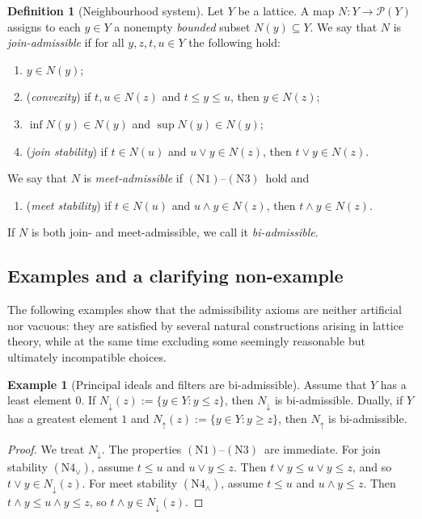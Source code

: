 \documentclass[11pt]{amsart}
\theoremstyle{definition}
\newtheorem{definition}[theorem]{Definition}
\newtheorem{example}[theorem]{Example}
\newcommand{\join}{\vee}
\newcommand{\meet}{\wedge}
\newcommand{\Pow}{\mathcal{P}}
\newcommand{\NOne}{\ensuremath{\mathrm{(N1)}}}
\newcommand{\NThree}{\ensuremath{\mathrm{(N3)}}}
\newcommand{\NFourJoin}{\ensuremath{\mathrm{(N4_{\vee})}}}
\newcommand{\NFourMeet}{\ensuremath{\mathrm{(N4_{\wedge})}}}
\begin{document}
\begin{definition}[Neighbourhood system]\label{def:neigh}
Let $Y$ be a lattice.
A map $N\colon Y\to\Pow(Y)$ assigns to each $y\in Y$ a nonempty \emph{bounded} subset $N(y)\subseteq Y$.
We say that $N$ is \emph{join-admissible} if for all $y,z,t,u\in Y$ the following hold:
\begin{enumerate}[label=\textup{(N\arabic*)},ref=N\arabic*]
\item\label{N1} $y\in N(y)$;
\item\label{N2} (\emph{convexity}) if $t,u\in N(z)$ and $t\le y\le u$, then $y\in N(z)$;
\item\label{N3} $\inf N(y)\in N(y)$ and $\sup N(y)\in N(y)$;
\item[\NFourJoin] (\emph{join stability}) if $t\in N(u)$ and $u\join y\in N(z)$, then $t\join y\in N(z)$.
\end{enumerate}
We say that $N$ is \emph{meet-admissible} if \NOne--\NThree\ hold and
\begin{enumerate}[label=\NFourMeet]
\item (\emph{meet stability}) if $t\in N(u)$ and $u\meet y\in N(z)$, then $t\meet y\in N(z)$.
\end{enumerate}
If $N$ is both join- and meet-admissible, we call it \emph{bi-admissible}.
\end{definition}

\subsection{Examples and a clarifying non-example}
The following examples show that the admissibility axioms are neither artificial nor
vacuous: they are satisfied by several natural constructions arising in lattice theory,
while at the same time excluding some seemingly reasonable but ultimately incompatible
choices.

\begin{example}[Principal ideals and filters are bi-admissible]\label{ex:ideals}
Assume that $Y$ has a least element $0$.
If $N_\downarrow(z):=\{y\in Y: y\le z\}$, then $N_\downarrow$ is bi-admissible.
Dually, if $Y$ has a greatest element $1$ and $N_\uparrow(z):=\{y\in Y: y\ge z\}$, then $N_\uparrow$ is bi-admissible.
\end{example}

\begin{proof}
We treat $N_\downarrow$.
The properties \NOne--\NThree\ are immediate.
For join stability \NFourJoin, assume $t\le u$ and $u\join y\le z$.
Then $t\join y\le u\join y\le z$, and so $t\join y\in N_\downarrow(z)$.
For meet stability \NFourMeet, assume $t\le u$ and $u\meet y\le z$.
Then $t\meet y\le u\meet y\le z$, so $t\meet y\in N_\downarrow(z)$.
\end{proof}
\end{document}
